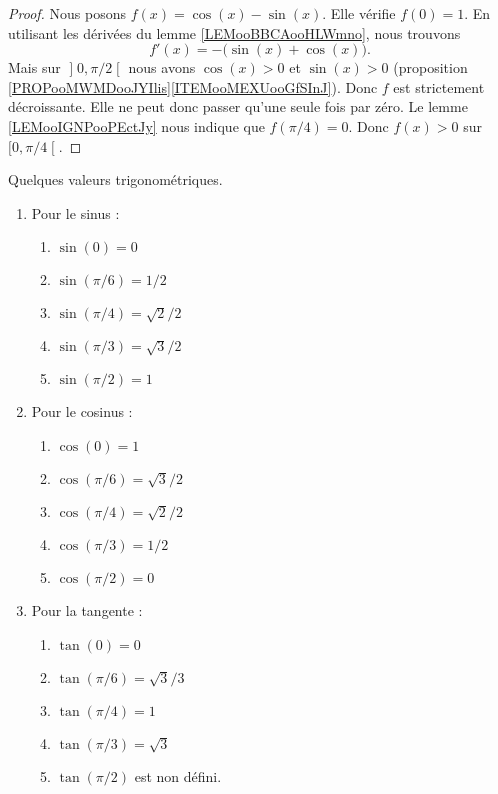 \begin{proof}
	Nous posons \( f(x)=\cos(x)-\sin(x)\). Elle vérifie \( f(0)=1\). En utilisant les dérivées du lemme \ref{LEMooBBCAooHLWmno}, nous trouvons
	\begin{equation}
		f'(x)=-\big( \sin(x)+\cos(x) \big).
	\end{equation}
	Mais sur \( \mathopen] 0 , \pi/2 \mathclose[\) nous avons \( \cos(x)>0\) et \( \sin(x)>0\) (proposition \ref{PROPooMWMDooJYIlis}\ref{ITEMooMEXUooGfSInJ}). Donc \( f\) est strictement décroissante. Elle ne peut donc passer qu'une seule fois par zéro. Le lemme \ref{LEMooIGNPooPEctJy} nous indique que \( f(\pi/4)=0\). Donc \( f(x)>0\) sur \( \mathopen[ 0 , \pi/4 \mathclose[\).
\end{proof}

\begin{proposition}
	Quelques valeurs trigonométriques.
	\begin{multicols}{2}
		\begin{enumerate}
			\item
			      Pour le sinus :
			      \begin{enumerate}
				      \item
				            \( \sin(0)=0\)
				      \item
				            \( \sin(\pi/6)=1/2\)
				      \item
				            \( \sin(\pi/4)=\sqrt{ 2 }/2\)
				      \item
				            \( \sin(\pi/3)=\sqrt{ 3 }/2\)
				      \item
				            \( \sin(\pi/2)=1\)
			      \end{enumerate}

			\item
			      Pour le cosinus :
			      \begin{enumerate}
				      \item
				            \( \cos(0)=1\)
				      \item
				            \( \cos(\pi/6)=\sqrt{ 3 }/2\)
				      \item
				            \( \cos(\pi/4)=\sqrt{ 2 }/2\)
				      \item
				            \( \cos(\pi/3)=1/2\)
				      \item
				            \( \cos(\pi/2)=0\)
			      \end{enumerate}
			\item
			      Pour la tangente :
			      \begin{enumerate}
				      \item
				            \( \tan(0)=0\)
				      \item
				            \( \tan(\pi/6)=\sqrt{ 3 }/3\)
				      \item
				            \( \tan(\pi/4)=1\)
				      \item
				            \( \tan(\pi/3)=\sqrt{ 3 }\)
				      \item
				            \( \tan(\pi/2)\) est non défini.
			      \end{enumerate}
		\end{enumerate}
	\end{multicols}
\end{proposition}

